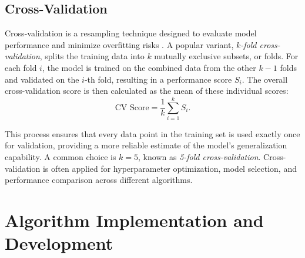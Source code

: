 \documentclass[11pt]{amsart}
\begin{document}
\subsection{Cross-Validation}

Cross-validation is a resampling technique designed to evaluate model performance and minimize overfitting risks \cite{Hastie2009}. A popular variant, \emph{$k$-fold cross-validation}, splits the training data into $k$ mutually exclusive subsets, or folds. For each fold $i$, the model is trained on the combined data from the other $k-1$ folds and validated on the $i$-th fold, resulting in a performance score $S_i$. The overall cross-validation score is then calculated as the mean of these individual scores:
\[
\text{CV Score} = \frac{1}{k} \sum_{i=1}^{k} S_i.
\]

This process ensures that every data point in the training set is used exactly once for validation, providing a more reliable estimate of the model's generalization capability. A common choice is $k=5$, known as \emph{5-fold cross-validation}. Cross-validation is often applied for hyperparameter optimization, model selection, and performance comparison across different algorithms.

\section{Algorithm Implementation and Development}
\end{document}
